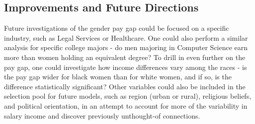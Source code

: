 \documentclass{article}
\begin{document}
\subsection{Improvements and Future Directions}

Future investigations of the gender pay gap could be focused on a specific industry, such as Legal Services or Healthcare. One could also perform a similar analysis for specific college majors - do men majoring in Computer Science earn more than women holding an equivalent degree? To drill in even further on the pay gap, one could investigate how income differences vary among the races - is the pay gap wider for black women than for white women, and if so, is the difference statistically significant? Other variables could also be included in the selection pool for future models, such as region (urban or rural), religious beliefs, and political orientation, in an attempt to account for more of the variability in salary income and discover previously unthought-of connections.

\begin{singlespace}
    
\end{singlespace}
\end{document}
